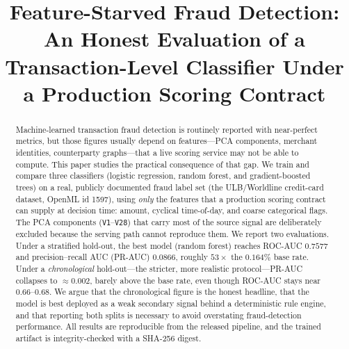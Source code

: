 \documentclass[conference]{IEEEtran}
\begin{document}
\title{Feature-Starved Fraud Detection: An Honest Evaluation of a\\
Transaction-Level Classifier Under a Production Scoring Contract}

\author{
\and
{}
}

\maketitle

\begin{abstract}
Machine-learned transaction fraud detection is routinely reported with
near-perfect metrics, but those figures usually depend on features---PCA
components, merchant identities, counterparty graphs---that a live scoring
service may not be able to compute. This paper studies the practical
consequence of that gap. We train and compare three classifiers
(logistic regression, random forest, and gradient-boosted trees) on a real,
publicly documented fraud label set (the ULB/Worldline credit-card dataset,
OpenML id 1597), using \emph{only} the features that a production scoring
contract can supply at decision time: amount, cyclical time-of-day, and
coarse categorical flags. The PCA components (\texttt{V1}--\texttt{V28}) that
carry most of the source signal are deliberately excluded because the serving
path cannot reproduce them. We report two evaluations. Under a stratified
hold-out, the best model (random forest) reaches ROC-AUC $0.7577$ and
precision--recall AUC (PR-AUC) $0.0866$, roughly $53\times$ the $0.164\%$
base rate. Under a \emph{chronological} hold-out---the stricter, more
realistic protocol---PR-AUC collapses to $\approx 0.002$, barely above the
base rate, even though ROC-AUC stays near $0.66$--$0.68$. We argue that the
chronological figure is the honest headline, that the model is best deployed
as a weak secondary signal behind a deterministic rule engine, and that
reporting both splits is necessary to avoid overstating fraud-detection
performance. All results are reproducible from the released pipeline, and the
trained artifact is integrity-checked with a SHA-256 digest.
\end{abstract}
\end{document}
